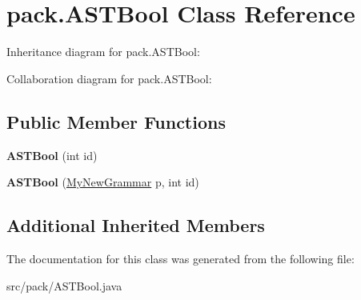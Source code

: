\hypertarget{classpack_1_1_a_s_t_bool}{}\section{pack.\+A\+S\+T\+Bool Class Reference}
\label{classpack_1_1_a_s_t_bool}


Inheritance diagram for pack.\+A\+S\+T\+Bool\+:


Collaboration diagram for pack.\+A\+S\+T\+Bool\+:
\subsection*{Public Member Functions}
\begin{DoxyCompactItemize}
\item 
{\bfseries A\+S\+T\+Bool} (int id)\hypertarget{classpack_1_1_a_s_t_bool_ae6e25937f18f538afd142e94dbe27450}{}\label{classpack_1_1_a_s_t_bool_ae6e25937f18f538afd142e94dbe27450}

\item 
{\bfseries A\+S\+T\+Bool} (\hyperlink{classpack_1_1_my_new_grammar}{My\+New\+Grammar} p, int id)\hypertarget{classpack_1_1_a_s_t_bool_aaa98fe0d610ee3a7e0399acea0b8f9a7}{}\label{classpack_1_1_a_s_t_bool_aaa98fe0d610ee3a7e0399acea0b8f9a7}

\end{DoxyCompactItemize}
\subsection*{Additional Inherited Members}


The documentation for this class was generated from the following file\+:\begin{DoxyCompactItemize}
\item 
src/pack/A\+S\+T\+Bool.\+java\end{DoxyCompactItemize}
